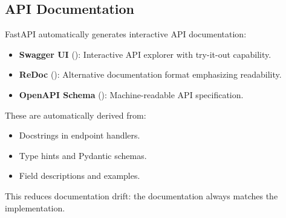 \subsection{API Documentation}

FastAPI automatically generates interactive API documentation:

\begin{itemize}
  \item \textbf{Swagger UI} (): Interactive API explorer with try-it-out capability.
  \item \textbf{ReDoc} (): Alternative documentation format emphasizing readability.
  \item \textbf{OpenAPI Schema} (): Machine-readable API specification.
\end{itemize}

These are automatically derived from:
\begin{itemize}
  \item Docstrings in endpoint handlers.
  \item Type hints and Pydantic schemas.
  \item Field descriptions and examples.
\end{itemize}

This reduces documentation drift: the documentation always matches the implementation.
